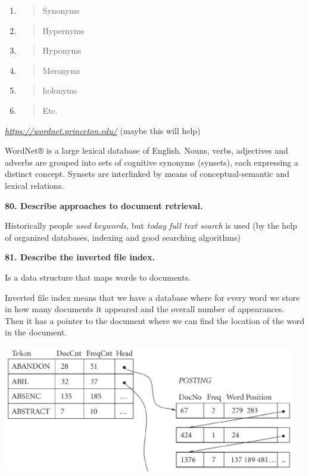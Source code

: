 \begin{enumerate}
\def\labelenumi{\arabic{enumi}.}
\item
  \begin{quote}
  Synonyms
  \end{quote}
\item
  \begin{quote}
  Hypernyms
  \end{quote}
\item
  \begin{quote}
  Hyponyms
  \end{quote}
\item
  \begin{quote}
  Meronyms
  \end{quote}
\item
  \begin{quote}
  holonyms
  \end{quote}
\item
  \begin{quote}
  Etc.
  \end{quote}
\end{enumerate}

\href{https://wordnet.princeton.edu/}{\textit{https://wordnet.princeton.edu/}}
(maybe this will help)

WordNet® is a large lexical database of English. Nouns, verbs,
adjectives and adverbs are grouped into sets of cognitive synonyms
(synsets), each expressing a distinct concept. Synsets are interlinked
by means of conceptual-semantic and lexical relations.

\textbf{80. Describe approaches to document retrieval.}

Historically people \textit{used keywords,} but \textit{today
\emph{full text search}} is used (by the help of organized databases,
indexing and good searching algorithms)

\textbf{81. Describe the inverted file index.}

Is a data structure that maps words to documents.

Inverted file index means that we have a database where for every word
we store in how many documents it appeared and the overall number of
appearances. Then it has a pointer to the document where we can find the
location of the word in the document.

\includegraphics[width=5.03646in,height=2.17521in]{media/image10.png}


